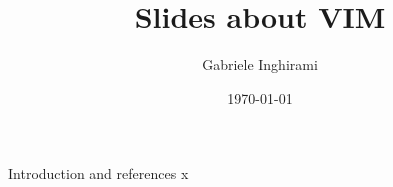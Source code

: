 

    
    \author[Gabriele Inghirami]{Gabriele Inghirami}
    \title{Slides about VIM}
    \date{\today}
    \maketitle
    
    \begin{frame}{Introduction and references}
    x
    \end{frame}
     

